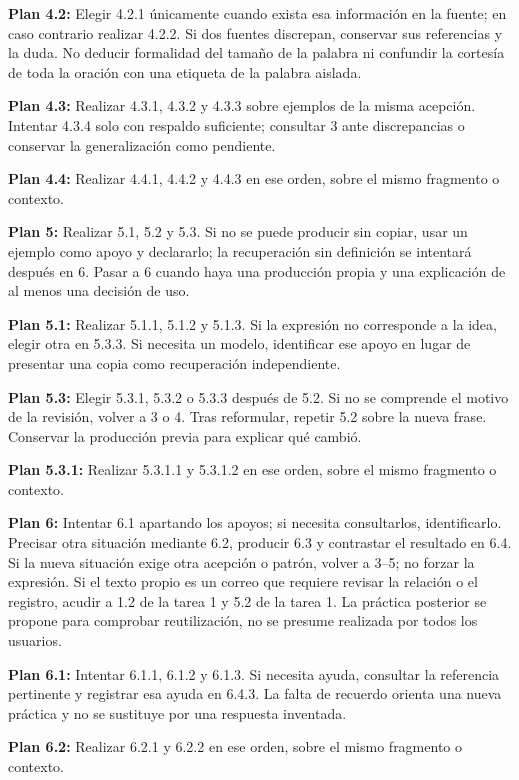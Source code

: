 \documentclass[10pt,a4paper]{article}
\begin{document}
\textbf{Plan 4.2:} Elegir 4.2.1 únicamente cuando exista esa información en la fuente; en caso contrario realizar 4.2.2. Si dos fuentes discrepan, conservar sus referencias y la duda. No deducir formalidad del tamaño de la palabra ni confundir la cortesía de toda la oración con una etiqueta de la palabra aislada.\par
\textbf{Plan 4.3:} Realizar 4.3.1, 4.3.2 y 4.3.3 sobre ejemplos de la misma acepción. Intentar 4.3.4 solo con respaldo suficiente; consultar 3 ante discrepancias o conservar la generalización como pendiente.\par
\textbf{Plan 4.4:} Realizar 4.4.1, 4.4.2 y 4.4.3 en ese orden, sobre el mismo fragmento o contexto.\par
\textbf{Plan 5:} Realizar 5.1, 5.2 y 5.3. Si no se puede producir sin copiar, usar un ejemplo como apoyo y declararlo; la recuperación sin definición se intentará después en 6. Pasar a 6 cuando haya una producción propia y una explicación de al menos una decisión de uso.\par
\textbf{Plan 5.1:} Realizar 5.1.1, 5.1.2 y 5.1.3. Si la expresión no corresponde a la idea, elegir otra en 5.3.3. Si necesita un modelo, identificar ese apoyo en lugar de presentar una copia como recuperación independiente.\par
\textbf{Plan 5.3:} Elegir 5.3.1, 5.3.2 o 5.3.3 después de 5.2. Si no se comprende el motivo de la revisión, volver a 3 o 4. Tras reformular, repetir 5.2 sobre la nueva frase. Conservar la producción previa para explicar qué cambió.\par
\textbf{Plan 5.3.1:} Realizar 5.3.1.1 y 5.3.1.2 en ese orden, sobre el mismo fragmento o contexto.\par
\textbf{Plan 6:} Intentar 6.1 apartando los apoyos; si necesita consultarlos, identificarlo. Precisar otra situación mediante 6.2, producir 6.3 y contrastar el resultado en 6.4. Si la nueva situación exige otra acepción o patrón, volver a 3--5; no forzar la expresión. Si el texto propio es un correo que requiere revisar la relación o el registro, acudir a 1.2 de la tarea 1 y 5.2 de la tarea 1. La práctica posterior se propone para comprobar reutilización, no se presume realizada por todos los usuarios.\par
\textbf{Plan 6.1:} Intentar 6.1.1, 6.1.2 y 6.1.3. Si necesita ayuda, consultar la referencia pertinente y registrar esa ayuda en 6.4.3. La falta de recuerdo orienta una nueva práctica y no se sustituye por una respuesta inventada.\par
\textbf{Plan 6.2:} Realizar 6.2.1 y 6.2.2 en ese orden, sobre el mismo fragmento o contexto.\par
\end{document}
